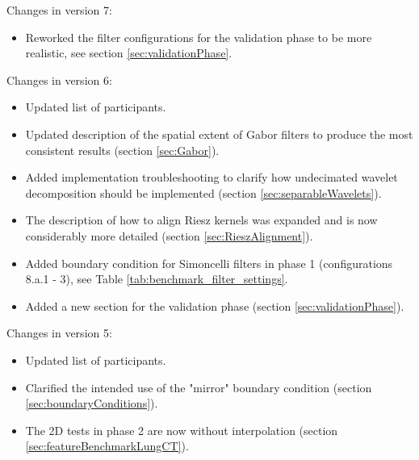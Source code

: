 \documentclass[fleqn,a4paper,oneside,openany]{book}
\begin{document}
\noindent Changes in version 7:
\begin{itemize}
    \item Reworked the filter configurations for the validation phase to be more realistic, see section \ref{sec:validationPhase}.
\end{itemize}

\noindent Changes in version 6:
\begin{itemize}
    \item Updated list of participants.
    \item Updated description of the spatial extent of Gabor filters to produce the most consistent results (section \ref{sec:Gabor}).
    \item Added implementation troubleshooting to clarify how undecimated wavelet decomposition should be implemented (section \ref{sec:separableWavelets}).
    \item The description of how to align Riesz kernels was expanded and is now considerably more detailed (section \ref{sec:RieszAlignment}).
    \item Added boundary condition for Simoncelli filters in phase 1 (configurations 8.a.1 - 3), see Table \ref{tab:benchmark_filter_settings}.
    \item Added a new section for the validation phase (section \ref{sec:validationPhase}).
\end{itemize}

\noindent Changes in version 5:
\begin{itemize}
    \item Updated list of participants.
    \item Clarified the intended use of the "mirror" boundary condition (section \ref{sec:boundaryConditions}).
    \item The 2D tests in phase 2 are now without interpolation (section \ref{sec:featureBenchmarkLungCT}).
\end{itemize}
\end{document}
